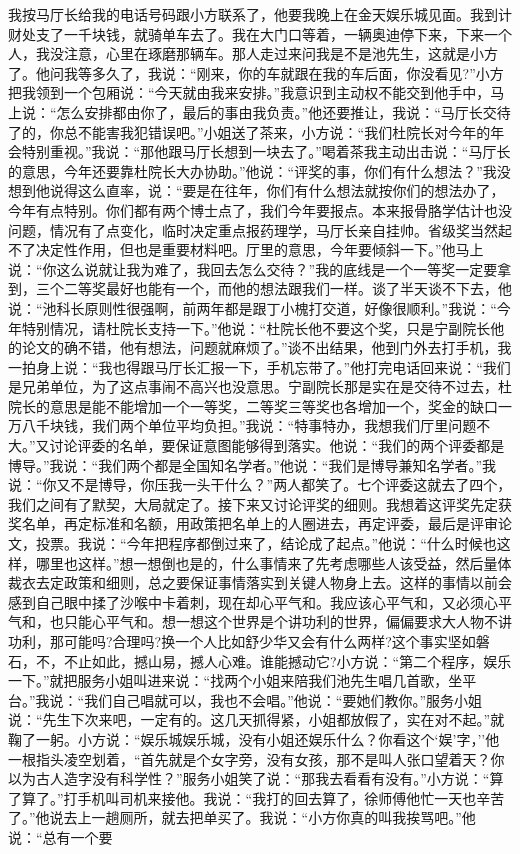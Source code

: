 \documentclass[12pt,oneside]{book}
\begin{document}
我按马厅长给我的电话号码跟小方联系了，他要我晚上在金天娱乐城见面。我到计财处支了一千块钱，就骑单车去了。我在大门口等着，一辆奥迪停下来，下来一个人，我没注意，心里在琢磨那辆车。那人走过来问我是不是池先生，这就是小方了。他问我等多久了，我说：``刚来，你的车就跟在我的车后面，你没看见?''小方把我领到一个包厢说：``今天就由我来安排。''我意识到主动权不能交到他手中，马上说：``怎么安排都由你了，最后的事由我负责。''他还要推让，我说：``马厅长交待了的，你总不能害我犯错误吧。''小姐送了茶来，小方说：``我们杜院长对今年的年会特别重视。''我说：``那他跟马厅长想到一块去了。''喝着茶我主动出击说：``马厅长的意思，今年还要靠杜院长大办协助。''他说：``评奖的事，你们有什么想法？''我没想到他说得这么直率，说：``要是在往年，你们有什么想法就按你们的想法办了，今年有点特别。你们都有两个博士点了，我们今年要报点。本来报骨胳学估计也没问题，情况有了点变化，临时决定重点报药理学，马厅长亲自挂帅。省级奖当然起不了决定性作用，但也是重要材料吧。厅里的意思，今年要倾斜一下。''他马上说：``你这么说就让我为难了，我回去怎么交待？''我的底线是一个一等奖一定要拿到，三个二等奖最好也能有一个，而他的想法跟我们一样。谈了半天谈不下去，他说：``池科长原则性很强啊，前两年都是跟丁小槐打交道，好像很顺利。''我说：``今年特别情况，请杜院长支持一下。''他说：``杜院长他不要这个奖，只是宁副院长他的论文的确不错，他有想法，问题就麻烦了。''谈不出结果，他到门外去打手机，我一拍身上说：``我也得跟马厅长汇报一下，手机忘带了。''他打完电话回来说：``我们是兄弟单位，为了这点事闹不高兴也没意思。宁副院长那是实在是交待不过去，杜院长的意思是能不能增加一个一等奖，二等奖三等奖也各增加一个，奖金的缺口一万八千块钱，我们两个单位平均负担。''我说：``特事特办，我想我们厅里问题不大。''又讨论评委的名单，要保证意图能够得到落实。他说：``我们的两个评委都是博导。''我说：``我们两个都是全国知名学者。''他说：``我们是博导兼知名学者。''我说：``你又不是博导，你压我一头干什么？''两人都笑了。七个评委这就去了四个，我们之间有了默契，大局就定了。接下来又讨论评奖的细则。我想着这评奖先定获奖名单，再定标准和名额，用政策把名单上的人圈进去，再定评委，最后是评审论文，投票。我说：``今年把程序都倒过来了，结论成了起点。''他说：``什么时候也这样，哪里也这样。''想一想倒也是的，什么事情来了先考虑哪些人该受益，然后量体裁衣去定政策和细则，总之要保证事情落实到关键人物身上去。这样的事情以前会感到自己眼中揉了沙喉中卡着刺，现在却心平气和。我应该心平气和，又必须心平气和，也只能心平气和。想一想这个世界是个讲功利的世界，偏偏要求大人物不讲功利，那可能吗?合理吗?换一个人比如舒少华又会有什么两样?这个事实坚如磐石，不，不止如此，撼山易，撼人心难。谁能撼动它?小方说：``第二个程序，娱乐一下。''就把服务小姐叫进来说：``找两个小姐来陪我们池先生唱几首歌，坐平台。''我说：``我们自己唱就可以，我也不会唱。''他说：``要她们教你。''服务小姐说：``先生下次来吧，一定有的。这几天抓得紧，小姐都放假了，实在对不起。''就鞠了一躬。小方说：``娱乐城娱乐城，没有小姐还娱乐什么？你看这个`娱'字，''他一根指头凌空划着，``首先就是个女字旁，没有女孩，那不是叫人张口望着天？你以为古人造字没有科学性？''服务小姐笑了说：``那我去看看有没有。''小方说：``算了算了。''打手机叫司机来接他。我说：``我打的回去算了，徐师傅他忙一天也辛苦了。''他说去上一趟厕所，就去把单买了。我说：``小方你真的叫我挨骂吧。''他说：``总有一个要
\end{document}
